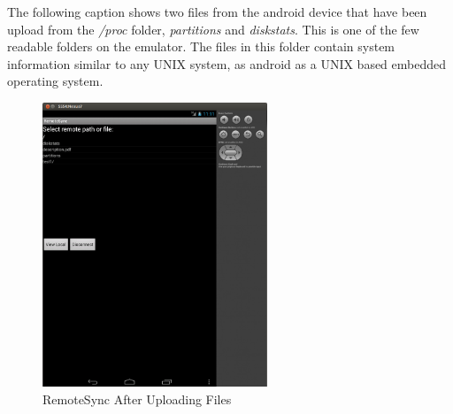 \documentclass[12pt]{article}
\begin{document}
The following caption shows two files from the android device that have been upload from the \emph{/proc} folder, \emph{partitions} and \emph{diskstats}. This is one of the few readable folders on the emulator. The files in this folder contain system information similar to any UNIX system, as android as a UNIX based embedded operating system.

\begin{figure}[H]
\center
\includegraphics[width=0.6\textwidth]{after-file-push.png}
\caption{RemoteSync After Uploading Files}
\end{figure}
\end{document}
